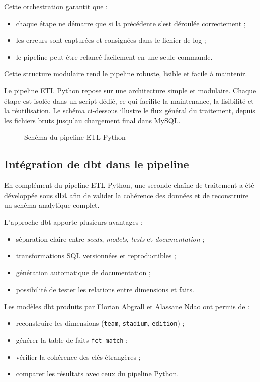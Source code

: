 \documentclass[12pt,a4paper]{article}
\begin{document}
Cette orchestration garantit que :

\begin{itemize}
    \item chaque étape ne démarre que si la précédente s’est déroulée correctement ;
    \item les erreurs sont capturées et consignées dans le fichier de log ;
    \item le pipeline peut être relancé facilement en une seule commande.
\end{itemize}

Cette structure modulaire rend le pipeline robuste, lisible et facile à maintenir.

Le pipeline ETL Python repose sur une architecture simple et modulaire.  
Chaque étape est isolée dans un script dédié, ce qui facilite la maintenance, la lisibilité et la réutilisation.  
Le schéma ci-dessous illustre le flux général du traitement, depuis les fichiers bruts jusqu’au chargement final dans MySQL.
\begin{figure}[htbp]
    \centering
    
    \caption{Schéma du pipeline ETL Python}
\end{figure}

\subsection*{Intégration de dbt dans le pipeline}

En complément du pipeline ETL Python, une seconde chaîne de traitement a été développée sous \textbf{dbt} afin de valider la cohérence des données et de reconstruire un schéma analytique complet.

L’approche dbt apporte plusieurs avantages :

\begin{itemize}
    \item séparation claire entre \textit{seeds}, \textit{models}, \textit{tests} et \textit{documentation} ;
    \item transformations SQL versionnées et reproductibles ;
    \item génération automatique de documentation ;
    \item possibilité de tester les relations entre dimensions et faits.
\end{itemize}

Les modèles dbt produits par Florian Abgrall et Alassane Ndao ont permis de :

\begin{itemize}
    \item reconstruire les dimensions (\texttt{team}, \texttt{stadium}, \texttt{edition}) ;
    \item générer la table de faits \texttt{fct\_match} ;
    \item vérifier la cohérence des clés étrangères ;
    \item comparer les résultats avec ceux du pipeline Python.
\end{itemize}
\end{document}
